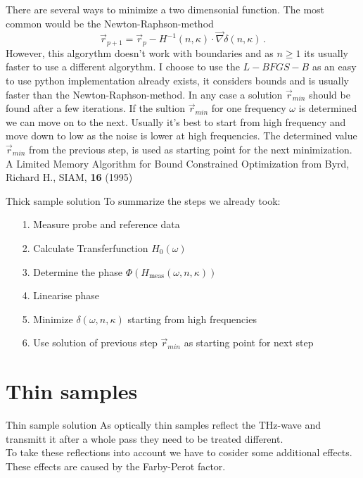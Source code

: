 \documentclass[aspectratio=1610, 9pt]{beamer}
\begin{document}
\begin{frame}
  There are several ways to minimize a two dimensonial function. The most common would be the Newton-Raphson-method
  \begin{equation}
    \vec{r}_{p + 1} = \vec{r}_{p} - H^{-1}(n,\kappa)\cdot\vec{\nabla}\delta(n, \kappa) \, .
  \end{equation}
  However, this algorythm doesn't work with boundaries and as $n \geq 1$ its usually faster to use a different algorythm.
  I choose to use the $L-BFGS-B$ as an easy to use python implementation already exists, it considers bounds and is usually faster than the Newton-Raphson-method.
  In any case a solution $\vec{r}_{min}$ should be found after a few iterations.
  If the sultion $\vec{r}_{min}$ for one frequency $\omega$ is determined  we can move on to the next.
  Usually it's best to start from high frequency and move down to low as the noise is lower at high frequencies.
  The determined value $\vec{r}_{min}$ from the previous step, is used as starting point for the next minimization.\\
  \textcolor{tugreen}{A Limited Memory Algorithm for Bound Constrained Optimization} from Byrd, Richard H., SIAM, \textbf{16} (1995)
\end{frame}

\begin{frame}{Thick sample solution}
  To summarize the steps we already took:
  \begin{itemize}
    \item[1.] Measure probe and reference data 
    \item[2.] Calculate Transferfunction $H_0(\omega)$
    \item[3.] Determine the phase $\Phi(H_\text{meas}(\omega, n, \kappa))$
    \item[4.] Linearise phase
    \item[5.] Minimize $\delta(\omega, n, \kappa)$ starting from high frequencies
    \item[6.] Use solution of previous step $\vec{r}_{min}$ as starting point for next step 
  \end{itemize}
\end{frame}

\section{Thin samples}
\begin{frame}{Thin sample solution}
As optically thin samples reflect the THz-wave and transmitt it after a whole pass they need to be treated different.\\
To take these reflections into account we have to cosider some additional effects.\\
These effects are caused by the Farby-Perot factor.
\end{frame}
\end{document}
